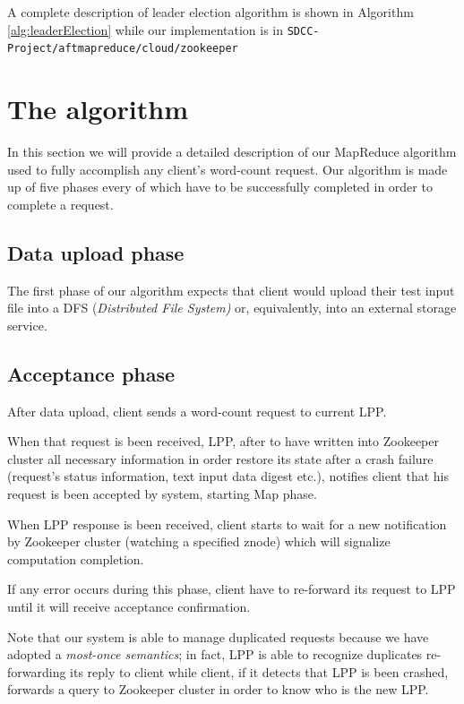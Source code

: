 \documentclass[sigchi]{acmart}
\begin{document}
A complete description of leader election algorithm is shown in Algorithm \ref{alg:leaderElection} while our implementation is in \texttt{SDCC-Project/aftmapreduce/cloud/zookeeper}

\section{The algorithm}

In this section we will provide a detailed description of our MapReduce algorithm used to fully accomplish any client's word-count request. Our algorithm is made up of five phases every of which have to be successfully completed in order to complete a request.

\subsection{Data upload phase}

The first phase of our algorithm expects that client would upload their test input file into a DFS (\textit{Distributed File System)} or, equivalently, into an external storage service.



\subsection{Acceptance phase}

After data upload, client sends a word-count request to current LPP. 

When that request is been received, LPP, after to have written into Zookeeper cluster all necessary information  in order restore its state after a crash failure (request's status information, text input data digest etc.),  notifies client that his request is been accepted by system, starting Map phase.

When LPP response is been received, client starts to wait for a new notification by Zookeeper cluster (watching a specified znode) which will signalize computation completion.

If any error occurs during this phase, client have to re-forward its request to LPP until it will receive acceptance confirmation. 

Note that our system is able to manage duplicated requests because we have adopted a \textit{most-once semantics}; in fact, LPP is able to recognize duplicates re-forwarding its reply to client while client, if it detects that LPP is been crashed, forwards a query to Zookeeper cluster in order to know who is the new LPP.
\end{document}
